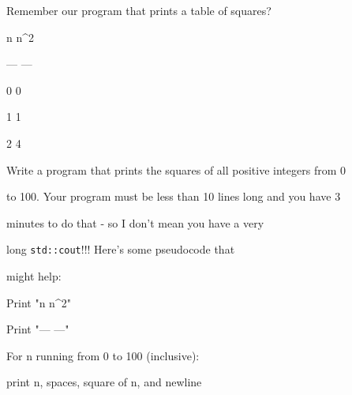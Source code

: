  Remember our program that prints a table of squares?

\begin{console}

n   n^2

--- ---

0   0

1   1

2   4

\end{console}

Write a program that prints the squares of all positive integers from 0

to 100. Your program must be less than 10 lines long and you have 3

minutes to do that - so I don't mean you have a very

long \texttt{std::cout}!!! Here's some pseudocode that

might help:

\begin{console}

Print "n   n^2\n"

Print "--- ---\n"

For n running from 0 to 100 (inclusive):

    print n, spaces, square of n, and newline

\end{console}

